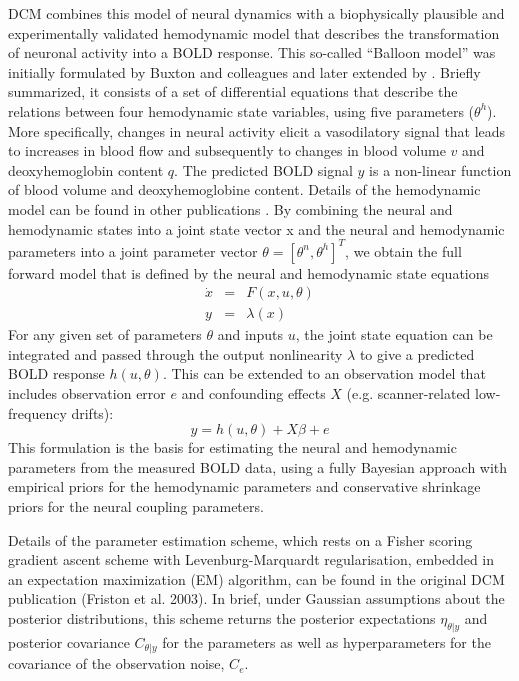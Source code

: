 DCM combines this model of neural dynamics with a biophysically plausible and experimentally validated hemodynamic model that describes the transformation of neuronal activity into a BOLD response.  This so-called ``Balloon model'' was initially formulated by Buxton and colleagues and later extended by \cite{balloon}.  Briefly summarized, it consists of a set of differential equations that describe the relations between four hemodynamic state variables, using five parameters ($\theta^h$).  More specifically, changes in neural activity elicit a vasodilatory signal that leads to increases in blood flow and subsequently to changes in blood volume $v$ and deoxyhemoglobin content $q$.  The predicted BOLD signal $y$ is a non-linear function of blood volume and deoxyhemoglobine content. Details of the hemodynamic model can be found in other publications \cite{balloon}.
By combining the neural and hemodynamic states into a joint state vector x and the neural and hemodynamic parameters into a joint parameter vector $\theta=[\theta^n, \theta^h]^T$, we obtain the full forward model that is defined by the neural and hemodynamic state equations
\begin{eqnarray}
\dot{x} & = & F(x,u,\theta) \\ \nonumber
y & = & \lambda(x)
\end{eqnarray}
For any given set of parameters $\theta$ and inputs $u$, the joint state equation can be integrated and passed through the output nonlinearity $\lambda$ to give a predicted BOLD response $h(u,\theta)$.  This can be extended to an observation model that includes observation error $e$ and confounding effects $X$ (e.g. scanner-related low-frequency drifts):
\begin{equation}
y = h(u,\theta) + X \beta + e
\end{equation}
This formulation is the basis for estimating the neural and hemodynamic parameters from the measured BOLD data, using a fully Bayesian approach with empirical priors for the hemodynamic parameters and conservative shrinkage priors for the neural coupling parameters.

Details of the parameter estimation scheme, which rests on a Fisher scoring gradient ascent scheme with Levenburg-Marquardt regularisation, embedded in an expectation maximization (EM) algorithm, can be found in the original DCM publication (Friston et al. 2003).  In brief, under Gaussian assumptions about the posterior distributions, this scheme returns the posterior expectations $\eta_{\theta | y}$ and posterior covariance  $C_{\theta | y}$ for the parameters as well as hyperparameters for the covariance of the observation noise, $C_e$.  

